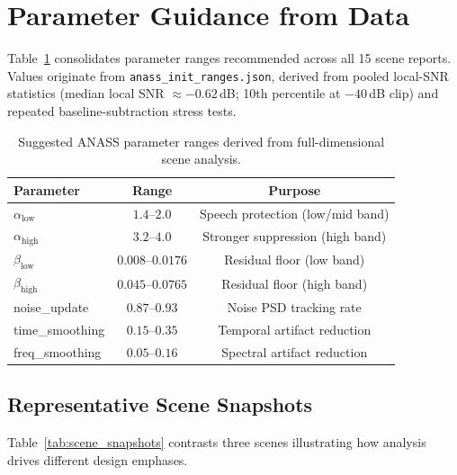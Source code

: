 \section{Parameter Guidance from Data}
\label{sec:param_guidance}

Table~\ref{tab:anass_ranges} consolidates parameter ranges recommended across all 15 scene reports. Values originate from \texttt{anass\_init\_ranges.json}, derived from pooled local-SNR statistics (median local SNR $\approx -0.62$\,dB; 10th percentile at $-40$\,dB clip) and repeated baseline-subtraction stress tests.

\begin{table}[H]
  \centering
  \caption{Suggested ANASS parameter ranges derived from full-dimensional scene analysis.}
  \label{tab:anass_ranges}
  \begin{tabular}{lcc}
    \toprule
    \textbf{Parameter} & \textbf{Range} & \textbf{Purpose} \\
    \midrule
    $\alpha_{\mathrm{low}}$  & $1.4$--$2.0$   & Speech protection (low/mid band) \\
    $\alpha_{\mathrm{high}}$ & $3.2$--$4.0$   & Stronger suppression (high band) \\
    $\beta_{\mathrm{low}}$   & $0.008$--$0.0176$ & Residual floor (low band) \\
    $\beta_{\mathrm{high}}$  & $0.045$--$0.0765$ & Residual floor (high band) \\
    noise\_update              & $0.87$--$0.93$  & Noise PSD tracking rate \\
    time\_smoothing            & $0.15$--$0.35$  & Temporal artifact reduction \\
    freq\_smoothing            & $0.05$--$0.16$  & Spectral artifact reduction \\
    \bottomrule
  \end{tabular}
\end{table}

\subsection{Representative Scene Snapshots}

Table~\ref{tab:scene_snapshots} contrasts three scenes illustrating how analysis drives different design emphases.

